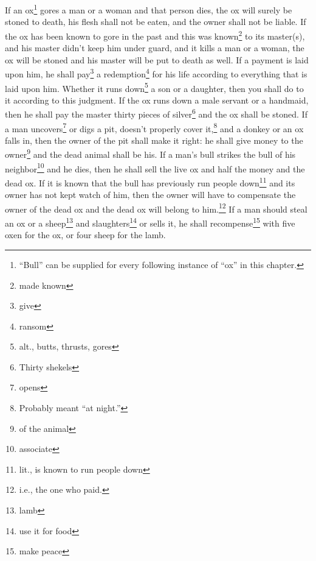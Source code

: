 \begin{enumerate*}[mode=unboxed]
     If an ox\footnote{``Bull'' can be supplied for every following instance of ``ox'' in this chapter.} gores a man or a woman and that person dies, the ox will surely be stoned to death, his flesh shall not be eaten, and the owner shall not be liable.%
     If the ox has been known to gore in the past and this was known\footnote{made known} to its master(s), and his master didn't keep him under guard, and it kills a man or a woman, the ox will be stoned and his master will be put to death as well.%
     If a payment is laid upon him, he shall pay\footnote{give} a redemption\footnote{ransom} for his life according to everything that is laid upon him.%
     Whether it runs down\footnote{alt., butts, thrusts, gores} a son or a daughter, then you shall do to it according to this judgment.%
     If the ox runs down a male servant or a handmaid, then he shall pay the master thirty pieces of silver\footnote{Thirty shekels} and the ox shall be stoned.%
     If a man uncovers\footnote{opens} or digs a pit, doesn't properly cover it,\footnote{Probably meant ``at night.''} and a donkey or an ox falls in,%
     then the owner of the pit shall make it right: he shall give money to the owner\footnote{of the animal} and the dead animal shall be his.%
     If a man's bull strikes the bull of his neighbor\footnote{associate} and he dies, then he shall sell the live ox and half the money and the dead ox.%
     If it is known that the bull has previously run people down\footnote{lit., is known to run people down} and its owner has not kept watch of him, then the owner will have to compensate the owner of the dead ox and the dead ox will belong to him.\footnote{i.e., the one who paid.}%
     If a man should steal an ox or a sheep\footnote{lamb} and slaughters\footnote{use it for food} or sells it, he shall recompense\footnote{make peace} with five oxen for the ox, or four sheep for the lamb.%
\end{enumerate*}
